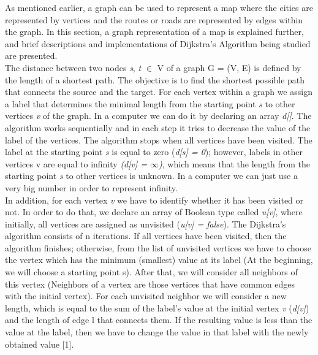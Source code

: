 \documentclass{article}
\begin{document}
As mentioned earlier, a graph can be used to represent a map where the cities are represented by vertices and the routes or roads are represented by edges within the graph. In this section, a graph representation of a map is explained further, and brief descriptions and implementations of Dijkstra’s Algorithm being studied are presented.
\vspace{5pt}
\\
The distance between two nodes \textit{s}, \textit{t} $\in$ V of a graph G = (V, E) is defined by the length of a shortest path. The objective is to find the shortest possible path that connects the source and the target. For each vertex within a graph we assign a label that determines the minimal length from the starting point \textit{s} to other vertices \textit{v} of the graph. In a computer we can do it by declaring an array \textit{d[]}. The algorithm works sequentially and in each step it tries to decrease the value of the label of the vertices. The algorithm stops when all vertices have been visited. The label at the starting point \textit{s} is equal to zero (\textit{d[s] = 0}); however, labels in other vertices v are equal to infinity \textit{(d[v] = $\infty$)}, which means that the length from the starting point \textit{s} to other vertices is unknown. In a computer we can just use a very big number in order to represent infinity. 
\vspace{5pt}
\\
In addition, for each vertex \textit{v} we have to identify whether it has been visited or not. In order to do that, we declare an array of Boolean type called \textit{u[v]}, where initially, all vertices are assigned as unvisited (\textit{u[v] = false}). The Dijkstra’s algorithm consists of n iterations. If all vertices have been visited, then the algorithm finishes; otherwise, from the list of unvisited vertices we have to choose the vertex which has the minimum (smallest) value at its label (At the beginning, we will choose a starting point s). After that, we will consider all neighbors of this vertex (Neighbors of a vertex are those vertices that have common edges with the initial vertex). For each  unvisited neighbor we will consider a new length, which is equal to the sum of the label’s value at the initial vertex \textit{v} (\textit{d[v]}) and the length of edge l that connects them. If the resulting value is less than the value at the label, then we have to change the value in that label with the newly obtained value [1].
\end{document}
